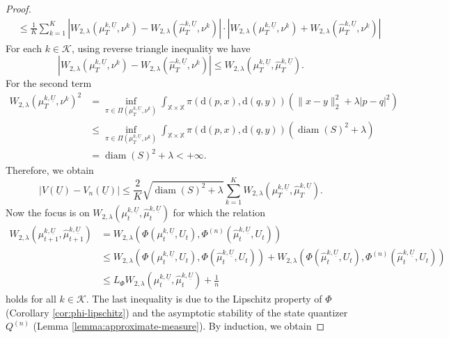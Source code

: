 \documentclass[11pt]{article}
\newcommand{\XX}{\mathbb{X}}
\newcommand{\cK}{\mathcal{K}}
\newcommand{\de}{\mathrm{d}} %
\begin{document}
\begin{proof}
\begin{align*}
        &\leq \frac{1}{K}\sum_{k=1}^K |W_{2,\lambda}(\mu_T^{k,\underline{U}}, \nu^k) - W_{2,\lambda}(\hat{\mu}_T^{k,\underline{U}}, \nu^k)|\cdot|W_{2,\lambda}(\mu_T^{k,\underline{U}}, \nu^k) + W_{2,\lambda}(\hat{\mu}_T^{k,\underline{U}}, \nu^k)|
    \end{align*}
    For each $k\in\cK$, using reverse triangle inequality we have
    \begin{equation*}
        |W_{2,\lambda}(\mu_T^{k,\underline{U}}, \nu^k) - W_{2,\lambda}(\hat{\mu}_T^{k,\underline{U}}, \nu^k)| \leq W_{2,\lambda}(\mu_T^{k,\underline{U}}, \hat{\mu}_T^{k,\underline{U}}).
    \end{equation*}
    For the second term
    \begin{align*}
        W_{2,\lambda}(\mu_T^{k,\underline{U}}, \nu^k)^2 &= \inf_{\pi\in\Pi(\mu_T^{k,\underline{U}}, \nu^k)}\int_{\XX\times\XX}\pi(\de (p,x), \de (q,y)) (\|x-y\|_2^2 + \lambda |p-q|^2)\\
        &\leq \inf_{\pi\in\Pi(\mu_T^{k,\underline{U}}, \nu^k)}\int_{\XX\times\XX}\pi(\de (p,x), \de (q,y))(\operatorname{diam}(S)^2 + \lambda)\\
        &= \operatorname{diam}(S)^2 + \lambda < +\infty.
    \end{align*}
    Therefore, we obtain
    \begin{equation*}
        |V(\underline{U}) - V_n(\underline{U})| \leq \frac{2}{K}\sqrt{\operatorname{diam}(S)^2 + \lambda} \sum_{k=1}^K W_{2,\lambda}(\mu_T^{k,\underline{U}}, \hat{\mu}_T^{k,\underline{U}}).
    \end{equation*}
    Now the focus is on $W_{2,\lambda}(\mu_t^{k,\underline{U}}, \hat{\mu}_t^{k,\underline{U}})$ for which the relation
    \begin{align*}
        W_{2,\lambda}(\mu_{t+1}^{k,\underline{U}}, \hat{\mu}_{t+1}^{k,\underline{U}}) &= W_{2,\lambda}(\Phi(\mu_{t}^{k,\underline{U}}, U_t), \Phi^{(n)}(\hat{\mu}_{t}^{k,\underline{U}}, U_t))\\
        &\leq W_{2,\lambda}(\Phi(\mu_{t}^{k,\underline{U}}, U_t), \Phi(\hat{\mu}_{t}^{k,\underline{U}}, U_t)) + W_{2,\lambda}(\Phi(\hat{\mu}_{t}^{k,\underline{U}}, U_t), \Phi^{(n)}(\hat{\mu}_{t}^{k,\underline{U}}, U_t))\\
        &\leq L_\Phi W_{2,\lambda}(\mu_{t}^{k,\underline{U}}, \hat{\mu}_{t}^{k,\underline{U}}) + \frac{1}{n}
    \end{align*}
    holds for all $k\in\cK$. The last inequality is due to the Lipschitz property of $\Phi$ (Corollary \ref{cor:phi-lipschitz}) and the asymptotic stability of the state quantizer $Q^{(n)}$ (Lemma \ref{lemma:approximate-measure}). By induction, we obtain

\end{proof}
\end{document}
